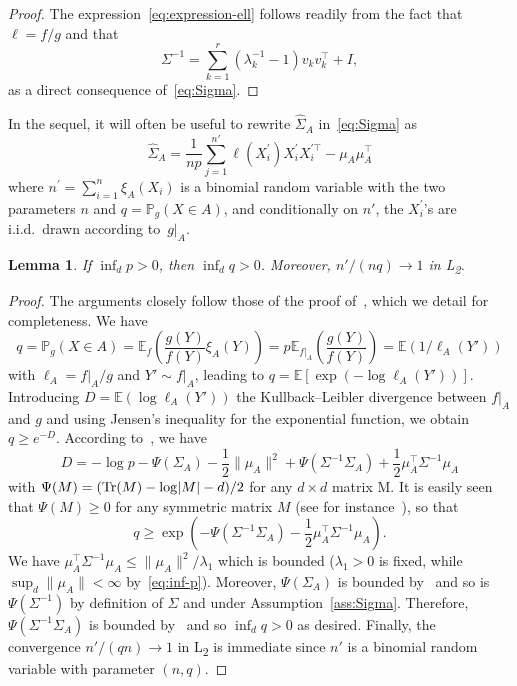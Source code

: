 \documentclass[]{article}
\newcommand{\E}{\mathbb{E}}
\renewcommand{\P}{\mathbb{P}}
\newcommand{\Tr}{\text{\rm Tr}}
\theoremstyle{plain}
\newtheorem{lemma}{Lemma}[section]
\theoremstyle{definition}
\begin{document}
\begin{proof}
	The expression~\eqref{eq:expression-ell} follows readily from the fact that $\ell = f/g$ and that
	\[ \Sigma^{-1} = \sum_{k=1}^r (\lambda^{-1}_k - 1) v_k v_k^\top + I, \]
	as a direct consequence of~\eqref{eq:Sigma}.
\end{proof}

In the sequel, it will often be useful to rewrite $\hat \Sigma_A$ in~\eqref{eq:Sigma} as
\begin{equation} \label{eq:Sigma-prime}
	\hat \Sigma_A = \frac{1}{np} \sum_{j=1}^{n'} \ell(X^\prime_i) X^\prime_i X^{\prime\top}_i - \mu_A \mu_A^\top
\end{equation}
where $n^\prime = \sum_{i=1}^n \xi_A(X_i)$ is a binomial random variable with the two parameters $n$ and $q = \P_g(X \in A)$, and conditionally on $n'$, the $X^\prime_i$'s are i.i.d.\ drawn according to~$g|_A$.

\begin{lemma}\label{lemma:q-n'}
	If $\inf_d p > 0$, then $\inf_d q > 0$. Moreover, $n'/(nq) \to 1$ in \textnormal{L}\textsubscript2.
\end{lemma}

\begin{proof}
	The arguments closely follow those of the proof of~\cite[Corollary $3.5$]{beh2023insight}, which we detail for completeness. We have
	\[ q = \P_g(X \in A) = \E_f \left( \frac{g(Y)}{f(Y)} \xi_A(Y) \right) = p \E_{f|_A} \left( \frac{g(Y)}{f(Y)} \right) = \E \left( 1/\ell_A(Y') \right) \]
	with $\ell_A = f|_A / g$ and $Y' \sim f|_A$, leading to $q = \E \left[ \exp \left( -\log \ell_A(Y') \right) \right]$. Introducing $D = \E(\log \ell_A(Y'))$ the Kullback--Leibler divergence between $f|_A$ and $g$ and using Jensen's inequality for the exponential function, we obtain $q \geq e^{-D}$. According to~\cite[Lemma~$3.4$]{beh2023insight}, we have
	\[ D = -\log p - \Psi(\Sigma_A) - \frac{1}{2} \lVert \mu_A \rVert^2 + \Psi(\Sigma^{-1} \Sigma_A) + \frac{1}{2} \mu_A^\top \Sigma^{-1} \mu_A \]
	with $\Psi(M) = (\Tr(M) - \log \lvert M \rvert - d)/2$ for any $d\times d$ matrix M. It is easily seen that $\Psi(M) \geq 0$ for any symmetric matrix $M$ (see for instance~\cite[Eq.~(10)]{beh2023insight}), so that
	\[ q \geq \exp\left( - \Psi(\Sigma^{-1} \Sigma_A) - \frac{1}{2} \mu_A^\top \Sigma^{-1} \mu_A \right). \]
	We have $\mu_A^\top \Sigma^{-1} \mu_A \leq \lVert \mu_A \rVert^2 / \lambda_1$ which is bounded ($\lambda_1 > 0$ is fixed, while $\sup_d \lVert \mu_A \rVert < \infty$ by~\eqref{eq:inf-p}). Moreover, $\Psi(\Sigma_A)$ is bounded by~\cite[Corollary~$4.2$]{beh2023insight} and so is $\Psi(\Sigma^{-1})$ by definition of $\Sigma$ and under Assumption~\ref{ass:Sigma}. Therefore, $\Psi(\Sigma^{-1} \Sigma_A)$ is bounded by~\cite[Lemma~$3.8$]{beh2023insight} and so $\inf_d q > 0$ as desired. Finally, the convergence $n'/(qn) \to 1$ in L\textsubscript{2} is immediate since $n'$ is a binomial random variable with parameter $(n,q)$.
\end{proof}
\end{document}

